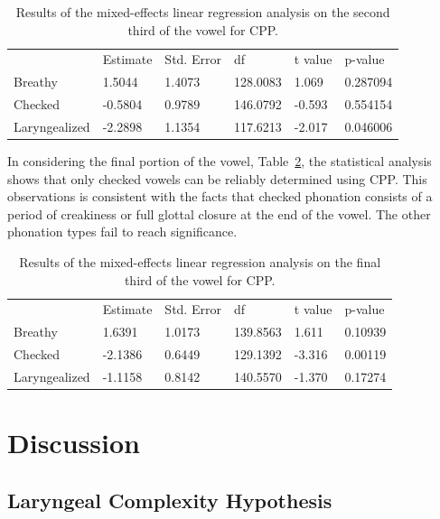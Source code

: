 \documentclass[12pt, letterpaper]{article}
\providecommand{\lsptoprule}{\midrule\toprule}
\providecommand{\lspbottomrule}{\bottomrule\midrule}
\begin{document}
\begin{table}[!h]
	\centering
	\caption{Results of the mixed-effects linear regression analysis on the second third of the vowel for CPP. }
	\label{tab:CPP_Second}
	 \begin{tabular}{llllll}
	  \lsptoprule
						&  Estimate  & Std. Error & df & t value & p-value \\
	  	Breathy   		&  1.5044   &  1.4073 & 128.0083 &  1.069 & 0.287094 \\
		Checked    		& -0.5804   &  0.9789 & 146.0792 & -0.593 & 0.554154 \\
		Laryngealized	& -2.2898   &  1.1354 & 117.6213 & -2.017 & 0.046006 \\
	  \lspbottomrule
	 \end{tabular}
\end{table}

In considering the final portion of the vowel, Table~\ref{tab:CPP_Third}, the statistical analysis shows that only checked vowels can be reliably determined using CPP. This observations is consistent with the facts that checked phonation consists of a period of creakiness or full glottal closure at the end of the vowel. The other phonation types fail to reach significance.

\begin{table}[!h]
	\centering
	\caption{Results of the mixed-effects linear regression analysis on the final third of the vowel for CPP. }
	\label{tab:CPP_Third}
	 \begin{tabular}{llllll}
	  \lsptoprule
						&  Estimate  & Std. Error & df & t value & p-value \\
	  	Breathy   		&  1.6391   &  1.0173  & 139.8563 &  1.611 & 0.10939 \\
		Checked    		& -2.1386   &  0.6449  & 129.1392 & -3.316 & 0.00119 \\
		Laryngealized	& -1.1158   &  0.8142  & 140.5570 & -1.370 & 0.17274\\
	  \lspbottomrule
	 \end{tabular}
\end{table}

\section{Discussion} \label{sec:Discussion}

\subsection{Laryngeal Complexity Hypothesis} \label{sec:LCH}
\end{document}
